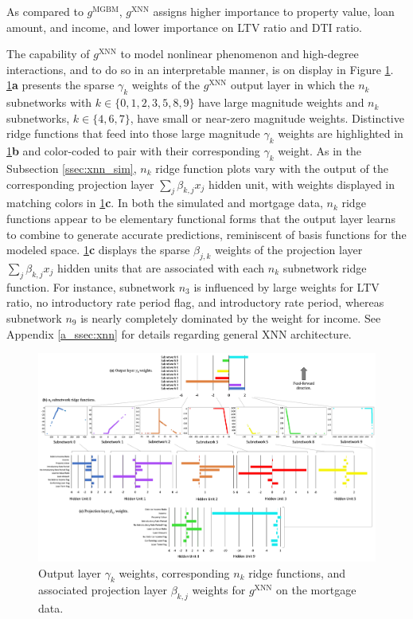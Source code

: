 \documentclass[information,article,submit,moreauthors,pdftex]{definitions/mdpi}
\begin{document}
\noindent As compared to $g^\text{MGBM}$, $g^\text{XNN}$ assigns higher importance to property value, loan amount, and income, and lower importance on LTV ratio and DTI ratio. 

The capability of $g^\text{XNN}$ to model nonlinear phenomenon and high-degree interactions, and to do so in an interpretable manner, is on display in Figure \ref{fig:mort_xnn_glob_ridge}. \ref{fig:mort_xnn_glob_ridge}\textbf{a} presents the sparse $\gamma_k$ weights of the $g^\text{XNN}$ output layer in which the $n_k$ subnetworks with $k \in \{0,1,2,3,5,8,9\}$ have large magnitude weights and $n_k$ subnetworks, $k \in \{4,6,7\}$, have small or near-zero magnitude weights. Distinctive ridge functions that feed into those large magnitude $\gamma_k$ weights are highlighted in \ref{fig:mort_xnn_glob_ridge}\textbf{b} and color-coded to pair with their corresponding $\gamma_k$ weight. As in the Subsection \ref{ssec:xnn_sim}, $n_k$ ridge function plots vary with the output of the corresponding projection layer $\sum_j\beta_{k,j}x_j$ hidden unit, with weights displayed in matching colors in \ref{fig:mort_xnn_glob_ridge}\textbf{c}. In both the simulated and mortgage data, $n_k$ ridge functions appear to be elementary functional forms that the output layer learns to combine to generate accurate predictions, reminiscent of basis functions for the modeled space. \ref{fig:mort_xnn_glob_ridge}\textbf{c} displays the sparse $\beta_{j,k}$ weights of the projection layer $\sum_j\beta_{k,j}x_j$ hidden units that are associated with each $n_k$ subnetwork ridge function. For instance, subnetwork $n_3$ is influenced by large weights for LTV ratio, no introductory rate period flag, and introductory rate period, whereas subnetwork $n_9$ is nearly completely dominated by the weight for income. See Appendix \ref{a_ssec:xnn} for details regarding general XNN architecture.

\begin{figure}[htb]
\hskip-35pt\includegraphics[width=19cm]{img/mort_xnn_glob_ridge.png}
\caption{Output layer $\gamma_k$ weights, corresponding $n_k$ ridge functions, and associated projection layer $\beta_{k,j}$ weights for $g^\text{XNN}$ on the mortgage data.}
\label{fig:mort_xnn_glob_ridge}
\end{figure} 
\end{document}
